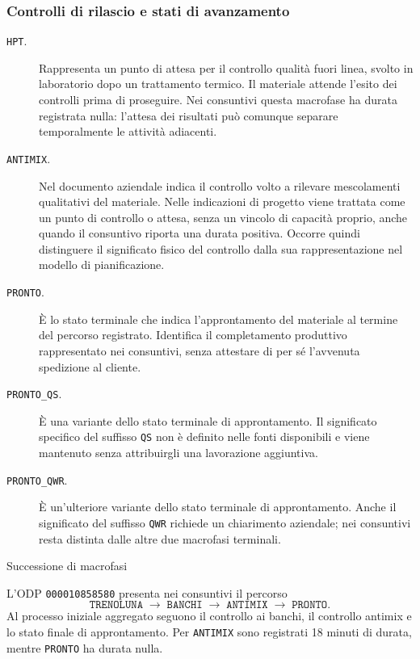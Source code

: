 \subsubsection{Controlli di rilascio e stati di avanzamento}

\begin{description}
\item[\texttt{HPT}.] Rappresenta un punto di attesa per il controllo qualità fuori linea, svolto in laboratorio dopo un trattamento termico. Il materiale attende l'esito dei controlli prima di proseguire. Nei consuntivi questa macrofase ha durata registrata nulla: l'attesa dei risultati può comunque separare temporalmente le attività adiacenti.

\item[\texttt{ANTIMIX}.] Nel documento aziendale indica il controllo volto a rilevare mescolamenti qualitativi del materiale. Nelle indicazioni di progetto viene trattata come un punto di controllo o attesa, senza un vincolo di capacità proprio, anche quando il consuntivo riporta una durata positiva. Occorre quindi distinguere il significato fisico del controllo dalla sua rappresentazione nel modello di pianificazione.

\item[\texttt{PRONTO}.] È lo stato terminale che indica l'approntamento del materiale al termine del percorso registrato. Identifica il completamento produttivo rappresentato nei consuntivi, senza attestare di per sé l'avvenuta spedizione al cliente.

\item[\texttt{PRONTO\_QS}.] È una variante dello stato terminale di approntamento. Il significato specifico del suffisso \texttt{QS} non è definito nelle fonti disponibili e viene mantenuto senza attribuirgli una lavorazione aggiuntiva.

\item[\texttt{PRONTO\_QWR}.] È un'ulteriore variante dello stato terminale di approntamento. Anche il significato del suffisso \texttt{QWR} richiede un chiarimento aziendale; nei consuntivi resta distinta dalle altre due macrofasi terminali.
\end{description}

\begin{examplebox}{Successione di macrofasi}

L'ODP \texttt{000010858580} presenta nei consuntivi il percorso
\[
\texttt{TRENOLUNA}\;\rightarrow\;\texttt{BANCHI}\;\rightarrow\;
\texttt{ANTIMIX}\;\rightarrow\;\texttt{PRONTO}.
\]
Al processo iniziale aggregato seguono il controllo ai banchi, il controllo antimix e lo stato finale di approntamento. Per \texttt{ANTIMIX} sono registrati 18 minuti di durata, mentre \texttt{PRONTO} ha durata nulla.
\end{examplebox}

